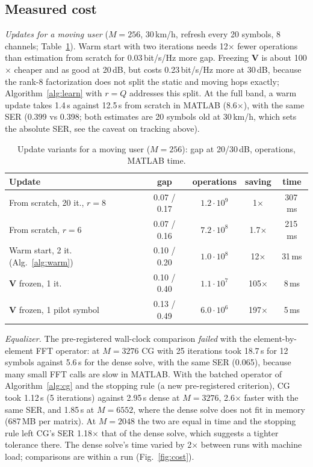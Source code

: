 \subsection{Measured cost}\label{sec:res-cost}
\emph{Updates for a moving user} ($M=256$, 30\,km/h, refresh every 20 symbols, 8 channels;
Table~\ref{tab:updates}). Warm start with two iterations needs 12$\times$ fewer operations than estimation
from scratch for 0.03\,bit/s/Hz more gap. Freezing $\bm V$ is about 100$\times$ cheaper and as good at 20\,dB,
but costs 0.23\,bit/s/Hz more at 30\,dB, because the rank-8 factorization does not split the static and
moving hops exactly; Algorithm~\ref{alg:learn} with $r=Q$ addresses this split. At the full band, a warm
update takes 1.4\,s against 12.5\,s from scratch in MATLAB (8.6$\times$), with the same SER (0.399 vs 0.398;
both estimates are 20 symbols old at 30\,km/h, which sets the absolute SER, see the caveat on tracking above).

\begin{table}[!htbp]\centering
\caption{Update variants for a moving user ($M=256$): gap at 20/30\,dB, operations, MATLAB time.}\label{tab:updates}
\begin{tabular}{lcccc}\toprule
Update & gap & operations & saving & time \\\midrule
From scratch, 20 it., $r=8$ & 0.07 / 0.17 & $1.2\cdot10^9$ & 1$\times$ & 307\,ms \\
From scratch, $r=6$ & 0.07 / 0.16 & $7.2\cdot10^8$ & 1.7$\times$ & 215\,ms \\
Warm start, 2 it. (Alg.~\ref{alg:warm}) & 0.10 / 0.20 & $1.0\cdot10^8$ & 12$\times$ & 31\,ms \\
$\bm V$ frozen, 1 it. & 0.10 / 0.40 & $1.1\cdot10^7$ & 105$\times$ & 8\,ms \\
$\bm V$ frozen, 1 pilot symbol & 0.13 / 0.49 & $6.0\cdot10^6$ & 197$\times$ & 5\,ms \\\bottomrule
\end{tabular}
\end{table}

\emph{Equalizer.} The pre-registered wall-clock comparison \emph{failed} with the element-by-element
FFT operator: at $M=3276$ CG with 25 iterations took 18.7\,s for 12 symbols against 5.6\,s for the dense
solve, with the same SER (0.065), because many small FFT calls are slow in MATLAB. With the batched
operator of Algorithm~\ref{alg:cg} and the stopping rule (a new pre-registered criterion), CG took
1.12\,s (5 iterations) against 2.95\,s dense at $M=3276$, 2.6$\times$ faster with the same SER, and
1.85\,s at $M=6552$, where the dense solve does not fit in memory (687\,MB per matrix). At $M=2048$ the
two are equal in time and the stopping rule left CG's SER 1.18$\times$ that of the dense solve, which
suggests a tighter tolerance there. The dense solve's time varied by 2$\times$ between runs with machine
load; comparisons are within a run (Fig.~\ref{fig:cost}).

